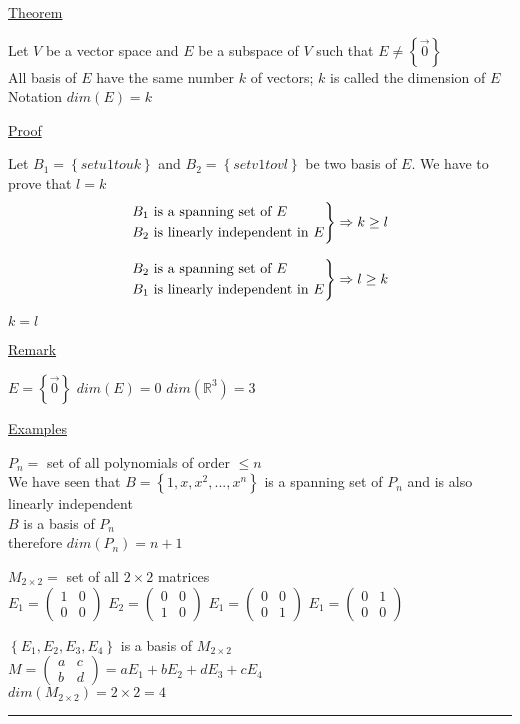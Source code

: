 \documentclass[12pt]{article}
\renewcommand{\v}[1]{\overrightarrow{#1}}
\newcommand\mm[1]{\begin{pmatrix}#1\end{pmatrix}}
\newcommand{\real}[0]{\mathbb{R}}
\newenvironment{block}[1][Label]{\underline{#1}\par}{}
\newenvironment{proof}{\block[Proof]}{\endblock}
\newenvironment{theorem}{\block[Theorem]}{\endblock}
\newenvironment{examples}{\shownto{-,compact}\underline{Examples}\enumerate}{\endenumerate\divider\endshownto}
\newcommand{\bb}[1]{\left\{#1\right\}}
\newcommand{\divider}[0]{\textcolor{lightgray}{\rule{\textwidth}{0.1pt}}}
\begin{document}
\begin{theorem}
	Let $V$ be a vector space and $E$ be a subspace of $V$ such that $E \ne \bb{\v{0}}$ \\
	All basis of $E$ have the same number $k$ of vectors; $k$ is called the dimension of $E$ \\
	Notation \qquad $dim(E) = k$
	
	\begin{proof}
		Let $B_1 = \bb{set u1 to uk}$ and $B_2 = \bb{set v1 to vl}$ be two basis of $E$. We have to prove that $l = k$ \\
		
		\begin{equation*}
			\begin{rcases*}
				B_1 \text{ is a spanning set of } E \\
				B_2 \text{ is linearly independent in } E
			\end{rcases*} \Rightarrow k \ge l
		\end{equation*}
		
		\begin{equation*}
		\begin{rcases*}
		B_2 \text{ is a spanning set of } E \\
		B_1 \text{ is linearly independent in } E
		\end{rcases*} \Rightarrow l \ge k
		\end{equation*}
		
		$k = l$
	\end{proof}
\end{theorem}

\begin{block}[Remark]
	$E = \bb{\v{0}}$ \quad
	$dim(E) = 0$ \quad
	$dim(\real^3) = 3$
\end{block}

\begin{examples}
	\item $P_n =$ set of all polynomials of order $\le n$ \\
	We have seen that $B = \bb{1, x, x^2, ..., x^n}$ is a spanning set of $P_n$ and is also linearly independent \\
	
	$B$ is a basis of $P_n$ \\
	therefore $dim(P_n) = n + 1$
	
	\item $M_{2 \times 2} =$ set of all $2 \times 2$ matrices \\
	$E_1 = \mm{1 & 0 \\ 0 & 0}$
	$E_2 = \mm{0 & 0 \\ 1 & 0}$
	$E_1 = \mm{0 & 0 \\ 0 & 1}$
	$E_1 = \mm{0 & 1 \\ 0 & 0}$
	
	$\bb{E_1, E_2, E_3, E_4}$ is a basis of $M_{2 \times 2}$ \\
	$M = \mm{a & c \\ b & d} = aE_1 + bE_2 + dE_3 + cE_4$ \\
	$dim(M_{2 \times 2}) = 2 \times 2 = 4$
\end{examples}
\end{document}
